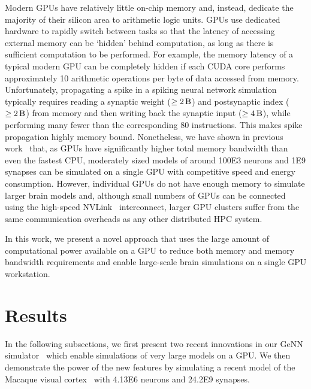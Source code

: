 \documentclass[9pt,a4paper]{amsart}
\begin{document}
Modern GPUs have relatively little on-chip memory and, instead, dedicate the majority of their silicon area to arithmetic logic units.
GPUs use dedicated hardware to rapidly switch between tasks so that the latency of accessing external memory can be `hidden' behind computation, as long as there is sufficient computation to be performed.
For example, the memory latency of a typical modern GPU can be completely hidden if each CUDA core performs approximately 10 arithmetic operations per byte of data accessed from memory.
Unfortunately, propagating a spike in a spiking neural network simulation typically requires reading a synaptic weight ($\ge \SI{2}{\byte}$) and postsynaptic index ($\ge \SI{2}{\byte}$) from memory and then writing back the synaptic input ($\ge \SI{4}{\byte}$), while performing many fewer than the corresponding 80 instructions. 
This makes spike propagation highly memory bound.
Nonetheless, we have shown in previous work~\citep{Knight2018} that, as GPUs have significantly higher total memory bandwidth than even the fastest CPU, moderately sized models of around \num{100E3} neurons and \num{1E9} synapses can be simulated on a single GPU with competitive speed and energy consumption.
However, individual GPUs do not have enough memory to simulate larger brain models and, although small numbers of GPUs can be connected using the high-speed NVLink~\citep{NVIDIACorporation} interconnect, larger GPU clusters suffer from the same communication overheads as any other distributed HPC system.

In this work, we present a novel approach that uses the large amount of computational power available on a GPU to reduce both memory and memory bandwidth requirements and enable large-scale brain simulations on a single GPU workstation.

\section{Results}
In the following subsections, we first present two recent innovations in our GeNN simulator~\citep{Yavuz2016} which enable simulations of very large models on a GPU.
We then demonstrate the power of the new features by simulating a recent model of the Macaque visual cortex~\citep{Schmidt2018} with \num{4.13E6} neurons and \num{24.2E9} synapses.
\end{document}
